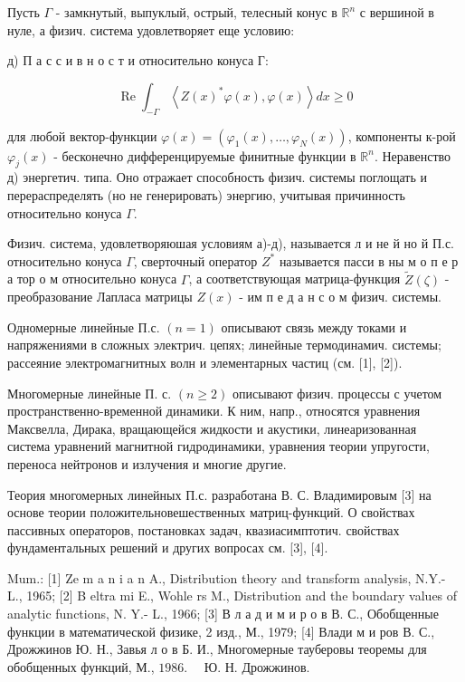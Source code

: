 \documentclass[10pt]{article}
\begin{document}
Пусть $\Gamma$ - замкнутый, выпуклый, острый, телесный конус в $\mathbb{R}^{n}$ с вершиной в нуле, а физич. система удовлетворяет еще условию:



д) П а с с и в н о с т и относительно конуса Г:



\[

\operatorname{Re} \int_{-\Gamma}\left\langle Z(x)^{*} \varphi(x), \varphi(x)\right\rangle d x \geqslant 0

\]



для любой вектор-функции $\varphi(x)=\left(\varphi_{1}(x), \ldots, \varphi_{N}(x)\right)$, компоненты к-рой $\varphi_{j}(x)$ - бесконечно дифференцируемые финитные функции в $\mathbb{R}^{n}$. Неравенство д) энергетич. типа. Оно отражает способность физич. системы поглощать и перераспределять (но не генерировать) энергию, учитывая причинность относительно конуса $\Gamma$.



Физич. система, удовлетворяюшая условиям а)-д), называется л и не й но й П.с. относительно конуса $\Gamma$, сверточный оператор $Z^{*}$ называется пасси в ны м о п е р а тор о м относительно конуса $\Gamma$, а соответствующая матрица-функция $\widetilde{Z}(\zeta)$ - преобразование Лапласа матрицы $Z(x)$ - им п е д а н с о м физич. системы.



Одномерные линейные П.с. $(n=1)$ описывают связь между токами и напряжениями в сложных электрич. цепях; линейные термодинамич. системы; рассеяние электромагнитных волн и элементарных частиц (см. [1], [2]).



Многомерные линейные П. с. $(n \geqslant 2)$ описывают физич. процессы с учетом пространственно-временной динамики. К ним, напр., относятся уравнения Максвелла, Дирака, вращающейся жидкости и акустики, линеаризованная система уравнений магнитной гидродинамики, уравнения теории упругости, переноса нейтронов и излучения и многие другие.



Теория многомерных линейных П.с. разработана В. С. Владимировым [3] на основе теории положительновешественных матриц-функций. О свойствах пассивных операторов, постановках задач, квазиасимптотич. свойствах фундаментальных решений и других вопросах см. [3], [4].



Mum.: [1] Ze m a n i a n A., Distribution theory and transform analysis, N.Y.- L., 1965; [2] B eltra mi E., Wohle rs M., Distribution and the boundary values of analytic functions, N. Y.- L., 1966; [3] В л а д и м и р о в В. С., Обобщенные функции в математической физике, 2 изд., М., 1979; [4] Влади м и ров В. С., Дрожжинов Ю. Н., Завья л о в Б. И., Многомерные тауберовы теоремы для обобщенных функций, М., $1986 . \quad$ Ю. Н. Дрожжинов.
\end{document}

